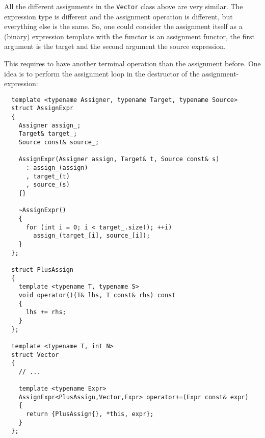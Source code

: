 \begin{rem}
  All the different assignments in the \texttt{Vector} class above are very similar. The expression type is
  different and the assignment operation is different, but everything else is the same. So, one could consider
  the assignment itself as a (binary) expression template with the functor is an assignment functor, the first
  argument is the target and the second argument the source expression.

  This requires to have another terminal operation than the assignment before. One idea is to perform the assignment
  loop in the destructor of the assignment-expression:
  \begin{verbatim}
  template <typename Assigner, typename Target, typename Source>
  struct AssignExpr
  {
    Assigner assign_;
    Target& target_;
    Source const& source_;

    AssignExpr(Assigner assign, Target& t, Source const& s)
      : assign_(assign)
      , target_(t)
      , source_(s)
    {}

    ~AssignExpr()
    {
      for (int i = 0; i < target_.size(); ++i)
        assign_(target_[i], source_[i]);
    }
  };

  struct PlusAssign
  {
    template <typename T, typename S>
    void operator()(T& lhs, T const& rhs) const
    {
      lhs += rhs;
    }
  };

  template <typename T, int N>
  struct Vector
  {
    // ...

    template <typename Expr>
    AssignExpr<PlusAssign,Vector,Expr> operator+=(Expr const& expr)
    {
      return {PlusAssign{}, *this, expr};
    }
  };
  \end{verbatim}
\end{rem}
